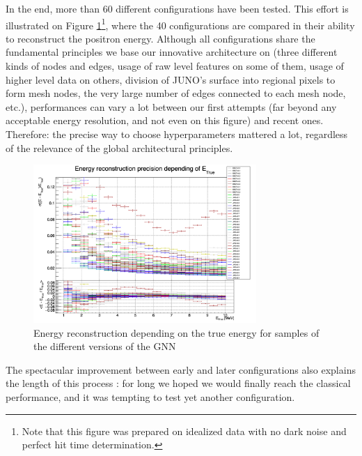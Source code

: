 \documentclass[../main.tex]{subfiles}
\begin{document}
In the end, more than 60 different configurations have been tested. This effort is illustrated on Figure \ref{fig:jgnn:histor}\footnote{Note that this figure was prepared on idealized data with no dark noise and perfect hit time determination.},
where the 40 configurations are compared in their ability to reconstruct the positron energy. Although all configurations share the fundamental principles we base our innovative architecture on (three different kinds of nodes and edges, usage of raw level features on some of them, usage of higher level data on others, division of JUNO's surface into regional pixels to form mesh nodes, the very large number of edges connected to each mesh node, etc.), performances can vary a lot between our first attempts (far beyond any acceptable energy resolution, and not even on this figure) and recent ones. Therefore: the precise way to choose hyperparameters mattered a lot, regardless of the relevance of the global architectural principles.

\begin{figure}
  \centering
  \includegraphics[height=6cm]{images/jgnn/GNN_Optimization_hist.png}
  \caption{Energy reconstruction depending on the true energy for samples of the different versions of the GNN}
  \label{fig:jgnn:histor}
\end{figure}

The spectacular improvement between early and later configurations also explains the length of this process : for long we hoped we would finally reach the classical performance, and it was tempting to test yet another configuration.

\end{document}
